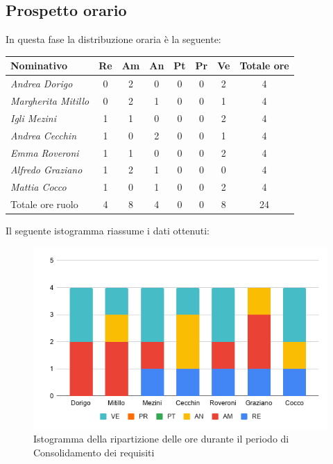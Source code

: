 {{\subsection{Prospetto orario}\label{PreventivoFaseDiConsolidamentoDeiRequisitiProspettoOrario}
In questa fase la distribuzione oraria è la seguente:
\quad
\def\tabularxcolumn#1{m{#1}}
{
	
	\begin{center}
		\renewcommand{\arraystretch}{1.4}
		\begin{tabularx}{\textwidth}{|X|c|c|c|c|c|c|c|}
			\hline
			\rowcolor{airforceblue}
			\textbf{Nominativo} & \textbf{Re} & \textbf{Am} & \textbf{An} & \textbf{Pt} & \textbf{Pr} & \textbf{Ve} & \textbf{Totale ore}\\
			\hline
			\textit{Andrea Dorigo} & 0 & 2 & 0 & 0 & 0 & 2 & 4\\
			\hline
			\textit{Margherita Mitillo} & 0 & 2 & 1 & 0 & 0 & 1 & 4\\
			\hline
			\textit{Igli Mezini} & 1 & 1 & 0 & 0 & 0 & 2 & 4\\
			\hline
			\textit{Andrea Cecchin} & 1 & 0 & 2 & 0 & 0 & 1 & 4\\
			\hline
			\textit{Emma Roveroni} & 1 & 1 & 0 & 0 & 0 & 2 & 4\\
			\hline
			\textit{Alfredo Graziano} & 1 & 2 & 1 & 0 & 0 & 0 & 4\\
			\hline
			\textit{Mattia Cocco} & 1 & 0 & 1 & 0 & 0 & 2 & 4\\
			\hline
			Totale ore ruolo & 4 & 8 & 4 & 0 & 0 & 8 & 24\\
			\hline
		\end{tabularx}
	\end{center}

Il seguente istogramma riassume i dati ottenuti:
\begin{figure}[!ht]
	\begin{center}
		\includegraphics[width=0.8\linewidth]{../immagini/pdp/istogramma_consolidamento_requisiti.png}
		\caption{Istogramma della ripartizione delle ore durante il periodo di Consolidamento dei
			requisiti
}
	\end{center}
\end{figure}

}}}
